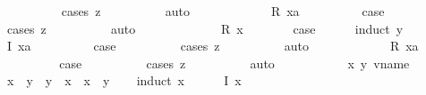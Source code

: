 \begin{isabellebody}
\ \ \ \ \ \ \ \ \isamarkupfalse%
\ {\isacharparenleft}cases\ z{\isacharparenright}\isanewline
\ \ \ \ \ \ \ \ \isamarkupfalse%
\ auto\isanewline
\ \ \ \ \isamarkupfalse%
\isanewline
\ \ \ \ \ \ \isamarkupfalse%
\ {\isacharparenleft}R\ xa{\isacharparenright}\isanewline
\ \ \ \ \ \ \isamarkupfalse%
\ \isamarkupfalse%
\ {\isacharquery}case\isanewline
\ \ \ \ \ \ \ \ \isamarkupfalse%
\ {\isacharparenleft}cases\ z{\isacharparenright}\isanewline
\ \ \ \ \ \ \ \ \isamarkupfalse%
\ auto\isanewline
\ \ \ \ \isamarkupfalse%
\isanewline
\ \ \isamarkupfalse%
\isanewline
\ \ \ \ \isamarkupfalse%
\ {\isacharparenleft}R\ x{\isacharparenright}\isanewline
\ \ \ \ \isamarkupfalse%
\ \isamarkupfalse%
\ {\isacharquery}case\isanewline
\ \ \ \ \isamarkupfalse%
\ {\isacharparenleft}induct\ y{\isacharparenright}\isanewline
\ \ \ \ \ \ \isamarkupfalse%
\ {\isacharparenleft}I\ xa{\isacharparenright}\isanewline
\ \ \ \ \ \ \isamarkupfalse%
\ \isamarkupfalse%
\ {\isacharquery}case\isanewline
\ \ \ \ \ \ \ \ \isamarkupfalse%
\ {\isacharparenleft}cases\ z{\isacharparenright}\isanewline
\ \ \ \ \ \ \ \ \isamarkupfalse%
\ auto\isanewline
\ \ \ \ \isamarkupfalse%
\isanewline
\ \ \ \ \ \ \isamarkupfalse%
\ {\isacharparenleft}R\ xa{\isacharparenright}\isanewline
\ \ \ \ \ \ \isamarkupfalse%
\ \isamarkupfalse%
\ {\isacharquery}case\isanewline
\ \ \ \ \ \ \ \ \isamarkupfalse%
\ {\isacharparenleft}cases\ z{\isacharparenright}\isanewline
\ \ \ \ \ \ \ \ \isamarkupfalse%
\ auto\isanewline
\ \ \ \ \isamarkupfalse%
\isanewline
\ \ \isamarkupfalse%
\isanewline
{}\isamarkupfalse%
\isanewline
\ \ \isamarkupfalse%
\ x\ y{\isacharcolon}{\isacharcolon}\ vname\isanewline
\ \ \isamarkupfalse%
\ {\isachardoublequoteopen}x\ {\isasymle}\ y\ {\isasymLongrightarrow}\ y\ {\isasymle}\ x\ {\isasymLongrightarrow}\ x\ {\isacharequal}\ y{\isachardoublequoteclose}\isanewline
\ \ \isamarkupfalse%
\ {\isacharparenleft}induct\ x{\isacharparenright}\isanewline
\ \ \ \ \isamarkupfalse%
\ {\isacharparenleft}I\ x{\isacharparenright}\isanewline
\ \ \ \ \isamarkupfalse%
\ \isamarkupfalse%

\end{isabellebody}
